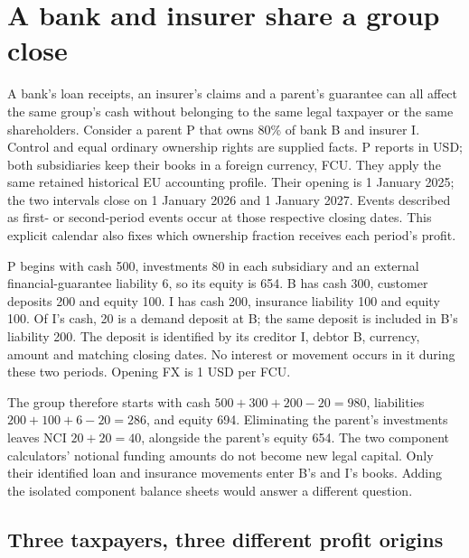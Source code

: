 \section{A bank and insurer share a group close}
\label{sec:sector-company-composition}

A bank's loan receipts, an insurer's claims and a parent's guarantee can all
affect the same group's cash without belonging to the same legal taxpayer or
the same shareholders. Consider a parent P that owns 80\% of bank B and
insurer I. Control and equal ordinary ownership rights are supplied facts.
P reports in USD; both subsidiaries keep their books in a foreign currency,
FCU. They apply the same retained historical EU accounting profile. Their
opening is 1 January 2025; the two intervals close on 1 January 2026 and
1 January 2027. Events described as first- or second-period events occur at
those respective closing dates. This explicit calendar also fixes which
ownership fraction receives each period's profit.

P begins with cash 500, investments 80 in each subsidiary and an external
financial-guarantee liability 6, so its equity is 654. B has cash 300,
customer deposits 200 and equity 100. I has cash 200, insurance liability 100
and equity 100. Of I's cash, 20 is a demand deposit at B; the same deposit is
included in B's liability 200. The deposit is identified by its creditor I,
debtor B, currency, amount and matching closing dates. No interest or movement
occurs in it during these two periods. Opening FX is 1 USD per FCU.

The group therefore starts with cash \(500+300+200-20=980\), liabilities
\(200+100+6-20=286\), and equity 694. Eliminating the parent's investments
leaves NCI \(20+20=40\), alongside the parent's equity 654. The two component
calculators' notional funding amounts do not become new legal capital. Only
their identified loan and insurance movements enter B's and I's books.
Adding the isolated component balance sheets would answer a different question.

\subsection{Three taxpayers, three different profit origins}

